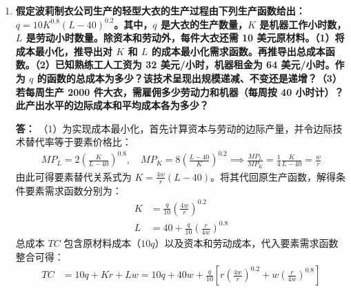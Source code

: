 \begin{enumerate}[label=\textbf{\arabic*.}, leftmargin=*]
\begin{center}
		\end{center}
		
		\newpage
		\item \textbf{假定波莉制衣公司生产的轻型大衣的生产过程由下列生产函数给出：$q = 10K^{0.8}(L - 40)^{0.2}$。其中，$q$ 是大衣的生产数量，$K$ 是机器工作小时数，$L$ 是劳动小时数量。除资本和劳动外，每件大衣还需 10 美元原材料。（1）将成本最小化，推导出对 $K$ 和 $L$ 的成本最小化需求函数。再推导出总成本函数。（2）已知熟练工人工资为 32 美元/小时，机器租金为 64 美元/小时。作为 $q$ 的函数的总成本为多少？该技术呈现出规模递减、不变还是递增？（3）若每周生产 2000 件大衣，需雇佣多少劳动力和机器（每周按 40 小时计）？此产出水平的边际成本和平均成本各为多少？}
		
		\textbf{答：}
		（1）为实现成本最小化，首先计算资本与劳动的边际产量，并令边际技术替代率等于要素价格比：
		\[
		\begin{aligned}
			MP_L = 2 \left( \frac{K}{L - 40} \right)^{0.8}, \quad MP_K = 8 \left( \frac{L - 40}{K} \right)^{0.2} \implies \frac{MP_L}{MP_K} = \frac{1}{4}\frac{K}{L - 40} = \frac{w}{r}
		\end{aligned}
		\]
		由此可得要素替代关系式为 $K = \frac{4w}{r}(L - 40)$。将其代回原生产函数，解得条件要素需求函数分别为：
		\[
		\begin{aligned}
			K &= \frac{q}{10} \left( \frac{4w}{r} \right)^{0.2} \\
			L &= 40 + \frac{q}{10} \left( \frac{r}{4w} \right)^{0.8}
		\end{aligned}
		\]
		总成本 $TC$ 包含原材料成本（$10q$）以及资本和劳动成本，代入要素需求函数整合可得：
		\[
		\begin{aligned}
			TC &= 10q + Kr + Lw = 10q + 40w + \frac{q}{10}\left[ r\left(\frac{4w}{r}\right)^{0.2} + w\left(\frac{r}{4w}\right)^{0.8} \right]
		\end{aligned}
		\]
		

\end{enumerate}
